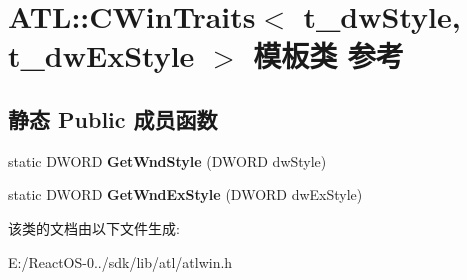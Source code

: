 \hypertarget{class_a_t_l_1_1_c_win_traits}{}\section{A\+TL\+:\+:C\+Win\+Traits$<$ t\+\_\+dw\+Style, t\+\_\+dw\+Ex\+Style $>$ 模板类 参考}
\label{class_a_t_l_1_1_c_win_traits}
\subsection*{静态 Public 成员函数}
\begin{DoxyCompactItemize}
\item 
\mbox{\label{class_a_t_l_1_1_c_win_traits_acd9be844e8e9d10730b3798f727a2d34}} 
static D\+W\+O\+RD {\bfseries Get\+Wnd\+Style} (D\+W\+O\+RD dw\+Style)
\item 
\mbox{\label{class_a_t_l_1_1_c_win_traits_a9951b2dffa6f3a399d3838419176be6d}} 
static D\+W\+O\+RD {\bfseries Get\+Wnd\+Ex\+Style} (D\+W\+O\+RD dw\+Ex\+Style)
\end{DoxyCompactItemize}


该类的文档由以下文件生成\+:\begin{DoxyCompactItemize}
\item 
E\+:/\+React\+O\+S-\/0../sdk/lib/atl/atlwin.\+h\end{DoxyCompactItemize}
